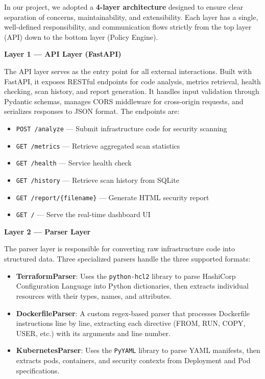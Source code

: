 In our project, we adopted a \textbf{4-layer architecture} designed to ensure clear separation of concerns, maintainability, and extensibility. Each layer has a single, well-defined responsibility, and communication flows strictly from the top layer (API) down to the bottom layer (Policy Engine).

\vspace{0.5cm}
\noindent\textbf{Layer 1 — API Layer (FastAPI)}

The API layer serves as the entry point for all external interactions. Built with FastAPI, it exposes RESTful endpoints for code analysis, metrics retrieval, health checking, scan history, and report generation. It handles input validation through Pydantic schemas, manages CORS middleware for cross-origin requests, and serializes responses to JSON format. The endpoints are:

\begin{itemize}
    \item \texttt{POST /analyze} — Submit infrastructure code for security scanning
    \item \texttt{GET /metrics} — Retrieve aggregated scan statistics
    \item \texttt{GET /health} — Service health check
    \item \texttt{GET /history} — Retrieve scan history from SQLite
    \item \texttt{GET /report/\{filename\}} — Generate HTML security report
    \item \texttt{GET /} — Serve the real-time dashboard UI
\end{itemize}

\vspace{0.5cm}
\noindent\textbf{Layer 2 — Parser Layer}

The parser layer is responsible for converting raw infrastructure code into structured data. Three specialized parsers handle the three supported formats:

\begin{itemize}
    \item \textbf{TerraformParser}: Uses the \texttt{python-hcl2} library to parse HashiCorp Configuration Language into Python dictionaries, then extracts individual resources with their types, names, and attributes.
    \item \textbf{DockerfileParser}: A custom regex-based parser that processes Dockerfile instructions line by line, extracting each directive (FROM, RUN, COPY, USER, etc.) with its arguments and line number.
    \item \textbf{KubernetesParser}: Uses the \texttt{PyYAML} library to parse YAML manifests, then extracts pods, containers, and security contexts from Deployment and Pod specifications.
\end{itemize}

